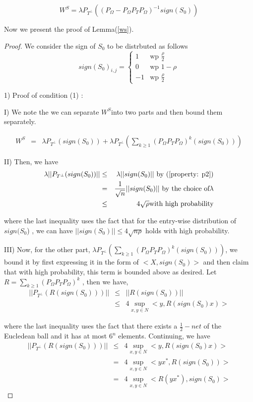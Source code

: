 \[
W^{S}=\lambda P_{T^{\bot}}((P_{\Omega}-P_{\Omega}P_{T}P_{\Omega})^{-1}sign(S_{0}))
\]

Now we present the proof of Lemma(\ref{ws}). 
\begin{proof}
We consider the sign of $S_{0}$ to be distrbuted as follows
\[
sign(S_{0})_{i,j}=\begin{cases}
1 & \text{wp }\frac{\rho}{2}\\
0 & \text{wp }1-\rho\\
-1 & \text{wp }\frac{\rho}{2}
\end{cases}
\]


1) Proof of condition (1) :

I) We note the we can separate $W^{S}$into two parts and then bound them separately.

\begin{eqnarray*}
W^{S} & = & \lambda P_{T^{\bot}}(sign(S_{0}))+\lambda P_{T^{\bot}}(\sum_{k\ge1}(P_{\Omega}P_{T}P_{\Omega})^{k}(sign(S_{0})))
\end{eqnarray*}


II) Then, we have
\begin{eqnarray*}
\lambda || P_{T^{\bot}}(sign(S_{0})) || & \le & \lambda||sign(S_{0})|| \text{ by (\ref{property: p2})}\\
 & = & \frac{1}{\sqrt{n}}||sign(S_{0})|| \text{ by the choice of}  \lambda\\
 & \le & 4\sqrt{\rho}\text{with high probability}
\end{eqnarray*}


where the last inequality uses the fact that for the entry-wise distribution of $sign(S_{0}$) , we can have $||sign(S_{0})||\le4\sqrt{n\rho}$ holds with high probability.

III) Now, for the other part, $\lambda P_{T^{\bot}}(\sum_{k\ge1}(P_{\Omega}P_{T}P_{\Omega})^{k}(sign(S_{0})))$, we bound it by first expressing it in the form of $<X,sign(S_{0})>$ and then claim that with high probability, this term is bounded above as desired. Let $R=\sum_{k\ge1}(P_{\Omega}P_{T}P_{\Omega})^{k}$ ,
then we have,
\begin{eqnarray*}
||P_{T^{\bot}}(R(sign(S_{0})))|| & \le & ||R(sign(S_{0}))||\\
 & \le & 4\sup_{x,y\in N}<y,R(sign(S_{0})x)>
\end{eqnarray*}


where the last inequality uses the fact that there exists a $\frac{1}{2}-net$ of the Eucledean ball and it has at most $6^{n}$ elements. Continuing, we have
\begin{eqnarray} 
||P_{T^{\bot}}(R(sign(S_{0})))|| & \le & 4\sup_{x,y\in N}<y,R(sign(S_{0})x)>\\
 & = & 4\sup_{x,y\in N}<yx^{*},R(sign(S_{0}))>\\
 & = & 4\sup_{x,y\in N}<R(yx^{*}),sign(S_{0})>\label{net}
\end{eqnarray}



\end{proof}

